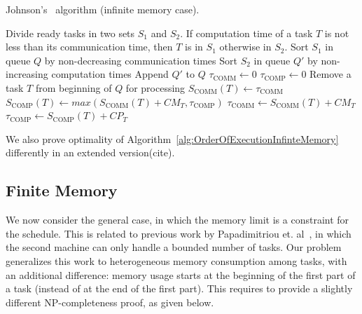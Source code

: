 \documentclass[sigconf]{acmart}
\newcommand{\scomm}{\ensuremath{{S}_{\text{COMM}}}}
\newcommand{\scomp}{\ensuremath{{S}_{\text{COMP}}}}
\begin{document}
	\begin{algorithm}
		\caption{\label{alg:OrderOfExecutionInfinteMemory}Johnson's~\cite{johnson} algorithm (infinite memory case).}
		\begin{algorithmic}[1]
			\STATE Divide ready tasks in two sets $S_1$ and $S_2$. If computation time of a task $T$ is not less than its communication time, then $T$ is in $S_1$ otherwise in $S_2$.
			\STATE Sort $S_1$ in queue $Q$ by non-decreasing communication times
			\STATE Sort $S_2$ in queue $Q'$ by non-increasing computation times
			\STATE Append $Q'$ to $Q$
			\STATE $\tau_{\text{COMM}} \gets 0$ \hfill{}
			\STATE $\tau_{\text{COMP}} \gets 0$\hfill {}
			\STATE Remove a task $T$ from beginning of $Q$ for processing
			\STATE $\scomm(T) \gets \tau_{\text{COMM}}$
			\STATE $\scomp(T) \gets max(\scomm(T) + CM_T, \tau_{\text{COMP}})$
			\STATE $\tau_{\text{COMM}} \gets \scomm(T) + CM_T$
			\STATE $\tau_{\text{COMP}} \gets \scomp(T) + CP_T$
			\ENDWHILE
		\end{algorithmic}
	\end{algorithm}
	
	We also prove optimality of Algorithm~\ref{alg:OrderOfExecutionInfinteMemory} differently in an extended version(cite).
	\subsection{Finite Memory}
	
	We now consider the general case, in which the memory limit is a
	constraint for the schedule. This is related to previous work by
	Papadimitriou et. al~\cite{Papadimitriou:1980:FSL:322203.322213}, in which the second machine
	can only handle a bounded number of tasks. Our problem generalizes this
	work to heterogeneous memory consumption among tasks, with an
	additional difference: memory usage starts at the beginning of the
	first part of a task (instead of at the end of the first part). This
	requires to provide a slightly different NP-completeness proof, as
	given below.
	
\end{document}
